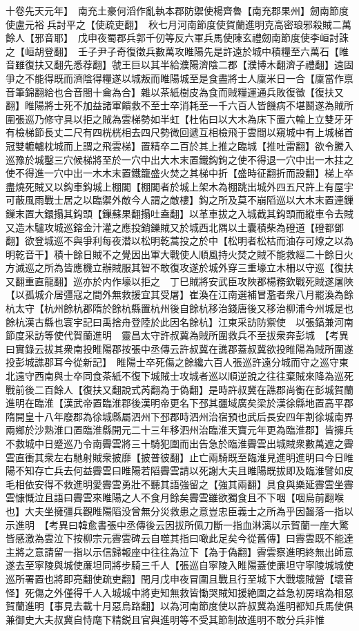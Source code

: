 十卷先天元年】　南充土豪何滔作亂執本郡防禦使楊齊魯【南充郡果州】劒南節度使盧元裕兵討平之【使疏吏翻】　秋七月河南節度使賀蘭進明克高密琅邪殺賊二萬餘人【邪音耶】　戊申夜蜀郡兵郭千仞等反六軍兵馬使陳玄禮劒南節度使李峘討誅之【峘胡登翻】　壬子尹子奇復徵兵數萬攻睢陽先是許遠於城中積糧至六萬石【睢音雖復扶又翻先悉荐翻】虢王巨以其半給濮陽濟陰二郡【濮博木翻濟子禮翻】遠固爭之不能得既而濟陰得糧遂以城叛而睢陽城至是食盡將士人廩米日一合【廩當作禀音筆錦翻給也合音閤十龠為合】雜以茶紙樹皮為食而賊糧運通兵敗復徵【復扶又翻】睢陽將士死不加益諸軍饋救不至士卒消耗至一千六百人皆饑病不堪鬭遂為賊所圍張巡乃修守具以拒之賊為雲梯勢如半虹【杜佑曰以大木為床下置六輪上立雙牙牙有檢梯節長丈二尺有四桄桄相去四尺勢微回遞互相檢飛于雲間以窺城中有上城梯首冠雙轆轤枕城而上謂之飛雲梯】置精卒二百於其上推之臨城【推吐雷翻】欲令騰入巡豫於城鑿三穴候梯將至於一穴中出大木末置鐵鈎鉤之使不得退一穴中出一木拄之使不得進一穴中出一木木末置鐵籠盛火焚之其梯中折【盛時征翻折而設翻】梯上卒盡燒死賊又以鈎車鈎城上棚閣【棚閣者於城上架木為棚跳出城外四五尺許上有屋宇可蔽風雨戰士居之以臨禦外敵今人謂之敵樓】鈎之所及莫不崩䧟巡以大木末置連鏁鏁末置大鐶搨其鈎頭【鏁蘇果翻搨吐盍翻】以革車拔之入城截其鈎頭而縱車令去賊又造木驢攻城巡鎔金汁灌之應投銷鑠賊又於城西北隅以土囊積柴為磴道【磴都鄧翻】欲登城巡不與爭利每夜潜以松明乾蒿投之於中【松明者松枯而油存可燎之以為明乾音干】積十餘日賊不之覺因出軍大戰使人順風持火焚之賊不能救經二十餘日火方滅巡之所為皆應機立辦賊服其智不敢復攻遂於城外穿三重壕立木柵以守巡【復扶又翻重直龍翻】巡亦於内作壕以拒之　丁巳賊將安武臣攻陜郡楊務欽戰死賊遂屠陜【以孤城介居彊寇之間外無救援宜其受屠】崔渙在江南選補冒濫者衆八月罷渙為餘杭太守【杭州餘杭郡隋於餘杭縣置杭州後自餘杭移治錢唐後又移治柳浦今州城是也餘杭漢古縣也寰宇記曰禹捨舟登陸於此因名餘杭】江東采訪防禦使　以張鎬兼河南節度采訪等使代賀蘭進明　靈昌太守許叔冀為賊所圍救兵不至拔衆奔彭城　【考異曰實錄云拔其衆南投睢陽郡按張中丞傳云許叔冀在譙郡蓋叔冀欲投睢陽為賊所圍遂投彭城譙郡耳今從新記】　睢陽士卒死傷之餘纔六百人張巡許遠分城而守之巡守東北遠守西南與士卒同食茶紙不復下城賊士攻城者巡以順逆說之往往棄賊來降為巡死戰前後二百餘人【復扶又翻說式芮翻為于偽翻】是時許叔冀在譙郡尚衡在彭城賀蘭進明在臨淮【漢武帝置臨淮郡後漢明帝更名下邳其疆域廣矣梁於漢徐縣地置高平郡隋開皇十八年廢郡為徐城縣屬泗州下邳郡時泗州治宿預也武后長安四年割徐城南界兩鄉於沙熟淮口置臨淮縣開元二十三年移泗州治臨淮天寶元年更為臨淮郡】皆擁兵不救城中日蹙巡乃令南霽雲將三十騎犯圍而出告急於臨淮霽雲出城賊衆數萬遮之霽雲直衝其衆左右馳射賊衆披靡【披普彼翻】止亡兩騎既至臨淮見進明進明曰今日睢陽不知存亡兵去何益霽雲曰睢陽若䧟霽雲請以死謝大夫且睢陽既拔即及臨淮譬如皮毛相依安得不救進明愛霽雲勇壯不聽其語強留之【強其兩翻】具食與樂延霽雲坐霽雲慷慨泣且語曰霽雲來睢陽之人不食月餘矣霽雲雖欲獨食且不下咽【咽烏前翻喉也】大夫坐擁彊兵觀睢陽䧟没曾無分災救患之意豈忠臣義士之所為乎因齧落一指以示進明　【考異曰韓愈書張中丞傳後云因拔所佩刀斷一指血淋漓以示賀蘭一座大驚皆感激為雲泣下按柳宗元霽雲碑云自噬其指曰噉此足矣今從舊傳】曰霽雲既不能達主將之意請留一指以示信歸報座中往往為泣下【為于偽翻】霽雲察進明終無出師意遂去至寜陵與城使亷坦同將步騎三千人【張巡自寜陵入睢陽蓋使亷坦守寜陵城城使巡所署置也將即亮翻使疏吏翻】閏月戊申夜冒圍且戰且行至城下大戰壞賊營【壞音怪】死傷之外僅得千人入城城中將吏知無救皆慟哭賊知援絶圍之益急初房琯為相惡賀蘭進明【事見去載十月惡烏路翻】以為河南節度使以許叔冀為進明都知兵馬使俱兼御史大夫叔冀自恃麾下精鋭且官與進明等不受其節制故進明不敢分兵非惟
